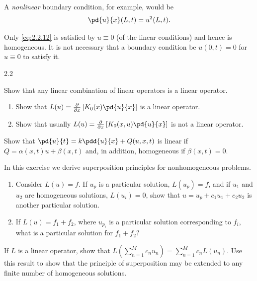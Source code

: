 A \emph{nonlinear} boundary condition, for example, would be
\begin{equation}
\label{eq:2.2.14}
\pd{u}{x}(L,t) = u^2(L,t).
\end{equation}

Only \eqref{eq:2.2.12} is satisfied by $u \equiv 0$ (of the linear conditions) and hence is homogeneous. It is not necessary that a boundary condition be $u(0,t) = 0$ for $u \equiv 0$ to satisfy it.

\begin{exercises}{2.2}

\item Show that any linear combination of linear operators is a linear operator.

\item
\begin{enumerate}
\item[(a)] Show that $L(u) = \frac{\partial}{\partial x}\left[K_0(x)\pd{u}{x}\right]$ is a linear operator.
\item[(b)] Show that usually $L(u) = \frac{\partial}{\partial x}\left[K_0(x,u)\pd{u}{x}\right]$ is not a linear operator.
\end{enumerate}

\item Show that $\pd{u}{t} = k\pdd{u}{x} + Q(u,x,t)$ is linear if $Q = \alpha(x,t)u + \beta(x,t)$ and, in addition, homogeneous if $\beta(x,t) = 0$.

\item In this exercise we derive superposition principles for nonhomogeneous problems.
\begin{enumerate}
\item[(a)] Consider $L(u) = f$. If $u_p$ is a particular solution, $L(u_p) = f$, and if $u_1$ and $u_2$ are homogeneous solutions, $L(u_i) = 0$, show that $u = u_p + c_1 u_1 + c_2 u_2$ is another particular solution.
\item[(b)] If $L(u) = f_1 + f_2$, where $u_{p_i}$ is a particular solution corresponding to $f_i$, what is a particular solution for $f_1 + f_2$?
\end{enumerate}

\item If $L$ is a linear operator, show that $L\!\left(\sum_{n=1}^{M} c_n u_n\right) = \sum_{n=1}^{M} c_n L(u_n)$. Use this result to show that the principle of superposition may be extended to any finite number of homogeneous solutions.

\end{exercises}
